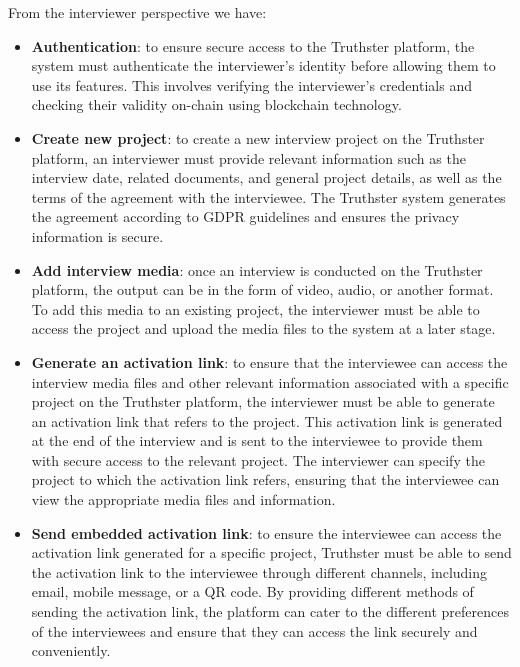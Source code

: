 \documentclass[target=mst,aauheader=]{thud}
\begin{document}
From the interviewer perspective we have:
\begin{itemize}
    \item \textbf{Authentication}: to ensure secure access to the Truthster platform, the system must authenticate the interviewer's identity before allowing them to use its features. This involves verifying the interviewer's credentials and checking their validity on-chain using blockchain technology. 
    \item \textbf{Create new project}: to create a new interview project on the Truthster platform, an interviewer must provide relevant information such as the interview date, related documents, and general project details, as well as the terms of the agreement with the interviewee. The Truthster system generates the agreement according to GDPR guidelines and ensures the privacy information is secure.
    \item \textbf{Add interview media}: once an interview is conducted on the Truthster platform, the output can be in the form of video, audio, or another format. To add this media to an existing project, the interviewer must be able to access the project and upload the media files to the system at a later stage.
    \item \textbf{Generate an activation link}: to ensure that the interviewee can access the interview media files and other relevant information associated with a specific project on the Truthster platform, the interviewer must be able to generate an activation link that refers to the project. This activation link is generated at the end of the interview and is sent to the interviewee to provide them with secure access to the relevant project. The interviewer can specify the project to which the activation link refers, ensuring that the interviewee can view the appropriate media files and information.
    \item \textbf{Send embedded activation link}: to ensure the interviewee can access the activation link generated for a specific project, Truthster must be able to send the activation link to the interviewee through different channels, including email, mobile message, or a QR code. By providing different methods of sending the activation link, the platform can cater to the different preferences of the interviewees and ensure that they can access the link securely and conveniently.
\end{itemize}
\end{document}
